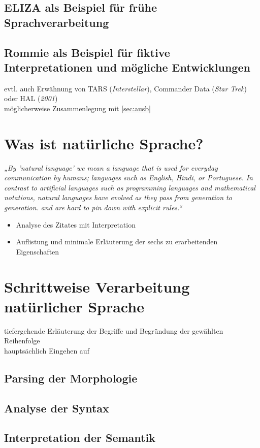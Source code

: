 \documentclass[12pt,twoside]{article}
\theoremstyle{plain}
\theoremstyle{definition}
\theoremstyle{remark}
\begin{document}
	\subsection{ELIZA als Beispiel für frühe Sprachverarbeitung}
	\label{ssec:eliza}
	\subsection{Rommie als Beispiel für fiktive Interpretationen und mögliche Entwicklungen}
	\label{ssec:rommie}
		evtl. auch Erwähnung von TARS (\textit{Interstellar}), Commander Data (\textit{Star Trek}) oder HAL (\textit{2001})\\
		möglicherweise Zusammenlegung mit \ref{sec:ausb}

\section{Was ist natürliche Sprache?}
\label{sec:def_lang}
\textit{„By 'natural language' we mean a language that is used for everyday communication by humans; languages such as English, Hindi, or Portuguese.
        In contrast to artificial languages such as programming languages and mathematical notations, natural languages have evolved as they pass from generation to generation.
        and are hard to pin down with explicit rules.“} \cite{Bird2009}
\begin{itemize}
    \item Analyse des Zitates mit Interpretation
    \item Auflistung und minimale Erläuterung der sechs zu erarbeitenden Eigenschaften
\end{itemize}

\section{Schrittweise Verarbeitung natürlicher Sprache}
\label{sec:meth}
tiefergehende Erläuterung der Begriffe und Begründung der gewählten Reihenfolge\\
hauptsächlich Eingehen auf \cite{Jur2009}
	\subsection{Parsing der Morphologie}
	\label{ssec:morph}
	\subsection{Analyse der Syntax}
	\label{ssec:syntax}
	\subsection{Interpretation der Semantik}
	\label{sec:sem}
\end{document}
